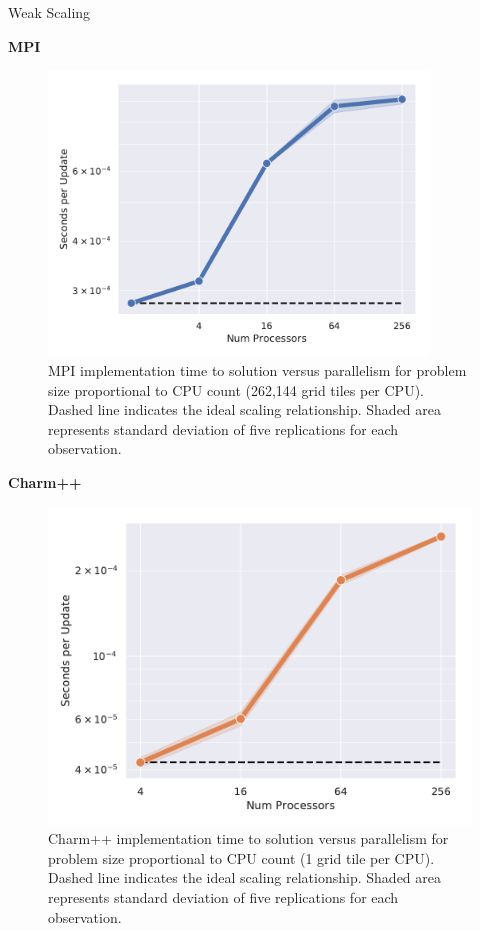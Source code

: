 \begin{block}{Weak Scaling}
  \vspace{-0.5ex}
\begin{alertblock}{\textbf{MPI}}
\begin{figure}
    \centering
    \includegraphics[width=0.9\textwidth]{img/MPIWeak}
  	\caption{
    MPI implementation time to solution versus parallelism for problem size proportional to CPU count (262,144 grid tiles per CPU).
    Dashed line indicates the ideal scaling relationship.
    Shaded area represents standard deviation of five replications for each observation.
    }
\end{figure}
\end{alertblock}
\vspace{-0.5ex}
\begin{alertblock}{\textbf{Charm++}}
\begin{figure}
    \centering
    \includegraphics[width=\textwidth]{img/CharmWeak}
  	\caption{
    Charm++ implementation time to solution versus parallelism for problem size proportional to CPU count (1 grid tile per CPU).
    Dashed line indicates the ideal scaling relationship.
    Shaded area represents standard deviation of five replications for each observation.
    }
\end{figure}
\end{alertblock}

\end{block}
